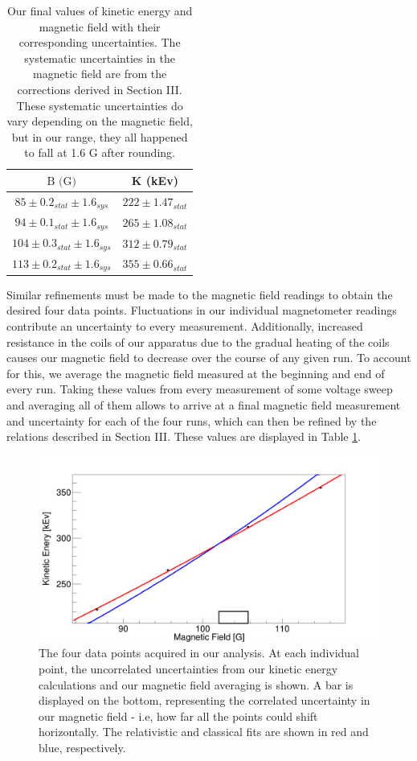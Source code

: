 \begin{table}[h]
    \begin{ruledtabular}
    \begin{tabular}{c c}
      $\text{B} \text{ (G)}$ & K (kEv) \\
      \hline
      $85 \pm 0.2_{stat} \pm 1.6_{sys}$ & $222 \pm 1.47_{stat}$  \\
      $94 \pm 0.1_{stat} \pm 1.6_{sys}$ & $265 \pm 1.08_{stat}$ \\
      $104 \pm 0.3_{stat} \pm 1.6_{sys}$ & $312 \pm 0.79_{stat}$  \\
      $113 \pm 0.2_{stat} \pm 1.6_{sys}$ & $355 \pm 0.66_{stat}$  \\
    \end{tabular}
  \end{ruledtabular}
  \caption{Our final values of kinetic energy and magnetic field with their corresponding uncertainties. The systematic uncertainties in the magnetic field are from the corrections derived in Section III. These systematic uncertainties do vary depending on the magnetic field, but in our range, they all happened to fall at 1.6 G after rounding.}
  \label{energy}
\end{table}

Similar refinements must be made to the magnetic field readings to obtain the desired four data points. Fluctuations in our individual magnetometer readings contribute an uncertainty to every measurement. Additionally, increased resistance in the coils of our apparatus due to the gradual heating of the coils causes our magnetic field to decrease over the course of any given run. To account for this, we average the magnetic field measured at the beginning and end of every run.  Taking these values from every measurement of some voltage sweep and averaging all of them allows to arrive at a final magnetic field measurement and uncertainty for each of the four runs, which can then be refined by the relations described in Section III. These values are displayed in Table \ref{energy}.

\begin{figure}[h]
  \includegraphics[width=.5\textwidth]{sysgraphpaper.pdf}
  \caption{The four data points acquired in our analysis. At each individual point, the uncorrelated uncertainties from our kinetic energy calculations and our magnetic field averaging is shown. A bar is displayed on the bottom, representing the correlated uncertainty in our magnetic field - i.e, how far all the points could shift horizontally. The relativistic and classical fits are shown in red and blue, respectively.}
  \label{sys}
\end{figure}

